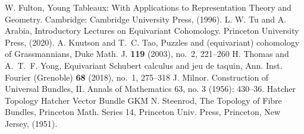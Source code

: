 \begin{thebibliography}{99}
  
   W. Fulton, Young Tableaux: With Applications to Representation Theory and Geometry. Cambridge: Cambridge University Press, (1996).
   L. W. Tu and A. Arabia, Introductory Lectures on Equivariant Cohomology. Princeton University Press, (2020).
   A. Knutson and T.~C. Tao, Puzzles and (equivariant) cohomology of Grassmannians, Duke Math. J. {\bf 119} (2003), no.~2, 221--260 
   H. Thomas and A.~T.~F. Yong, Equivariant Schubert calculus and jeu de taquin, Ann. Inst. Fourier (Grenoble) {\bf 68} (2018), no.~1, 275--318
   J. Milnor. Construction of Universal Bundles, II. Annals of Mathematics 63, no. 3 (1956): 430–36.
   Hatcher Topology
   Hatcher Vector Bundle
   GKM
   N. Steenrod, The Topology of Fibre Bundles, Princeton Math. Series 14,
  Princeton Univ. Press, Princeton, New Jersey, (1951).

\end{thebibliography}